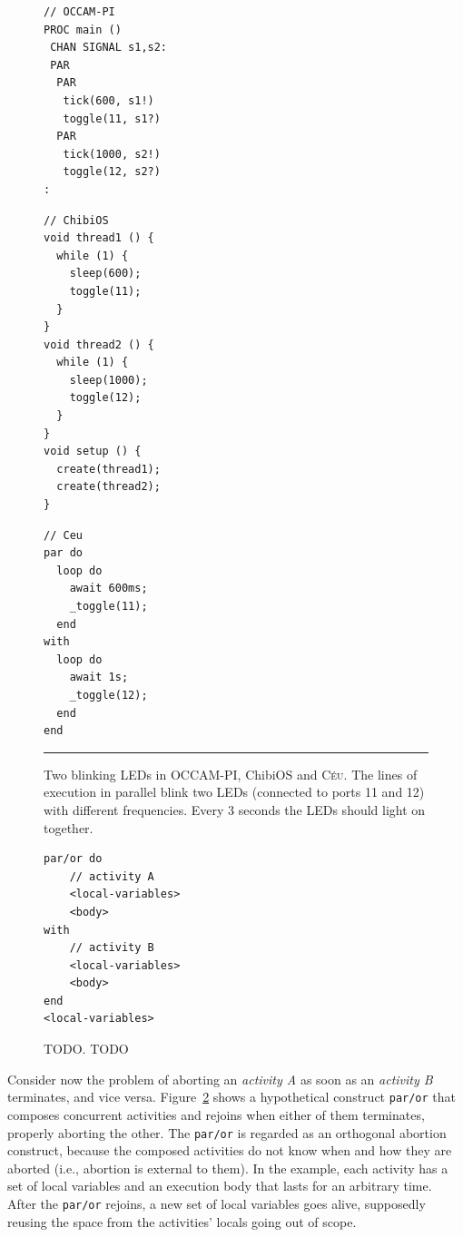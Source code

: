 \documentclass{acm_proc_article-sp}
\newcommand{\CEU}{\textsc{C\'{e}u}\xspace}
\newcommand{\code}[1] {{\small{\texttt{#1}}}}
\newcommand{\1}{\;}
\newcommand{\2}{\;\;}
\newcommand{\3}{\;\;\;}
\newcommand{\5}{\;\;\;\;\;}
\begin{document}
\begin{figure}[t]
\begin{minipage}[t]{0.34\linewidth}
\begin{lstlisting}
// OCCAM-PI
PROC main ()
 CHAN SIGNAL s1,s2:
 PAR
  PAR
   tick(600, s1!)
   toggle(11, s1?)
  PAR
   tick(1000, s2!)
   toggle(12, s2?)
:

\end{lstlisting}
\end{minipage}
%
\begin{minipage}[t]{0.33\linewidth}
\begin{lstlisting}
// ChibiOS
void thread1 () {
  while (1) {
    sleep(600);
    toggle(11);
  }
}
void thread2 () {
  while (1) {
    sleep(1000);
    toggle(12);
  }
}
void setup () {
  create(thread1);
  create(thread2);
}

\end{lstlisting}
\end{minipage}
%
\begin{minipage}[t]{0.31\linewidth}
\begin{lstlisting}
// Ceu
par do
  loop do
    await 600ms;
    _toggle(11);
  end
with
  loop do
    await 1s;
    _toggle(12);
  end
end
\end{lstlisting}
\end{minipage}
%
\rule{8.5cm}{0.37pt}
\caption{ Two blinking LEDs in OCCAM-PI, ChibiOS and \CEU.\newline
{\small %
The lines of execution in parallel blink two LEDs (connected to ports 11 and 
12) with different frequencies.
Every 3 seconds the LEDs should light on together.
}%
\label{lst.leds}
}
\end{figure}


\begin{figure}[t]
\begin{lstlisting}
par/or do
    // activity A
    <local-variables>
    <body>
with
    // activity B
    <local-variables>
    <body>
end
<local-variables>
\end{lstlisting}
\caption{ TODO.\newline
{\small %
TODO
}%
\label{lst.abortion}
}
\end{figure}

Consider now the problem of aborting an \emph{activity A} as soon as an
\emph{activity B} terminates, and vice versa.
%
Figure~\ref{lst.abortion} shows a hypothetical construct \code{par/or} that 
composes concurrent activities and rejoins when either of them terminates, 
properly aborting the other.
%
The \code{par/or} is regarded as an orthogonal abortion construct, because the 
composed activities do not know when and how they are aborted (i.e., abortion 
is external to them).
%
In the example, each activity has a set of local variables and an execution 
body that lasts for an arbitrary time.
After the \code{par/or} rejoins, a new set of local variables goes alive, 
supposedly reusing the space from the activities' locals going out of scope.
\end{document}
